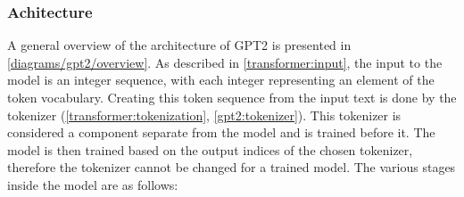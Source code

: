 \subsubsection{Achitecture}

A general overview of the architecture of GPT2 is presented in \cref{diagrams/gpt2/overview}.
As described in \cref{transformer:input}, the input to the model is an integer sequence, with each integer representing an element of the token vocabulary.
Creating this token sequence from the input text is done by the tokenizer (\cref{transformer:tokenization}, \cref{gpt2:tokenizer}). This tokenizer is considered a component separate from the model and is trained before it. The model is then trained based on the output indices of the chosen tokenizer, therefore the tokenizer cannot be changed for a trained model. The various stages inside the model are as follows:

